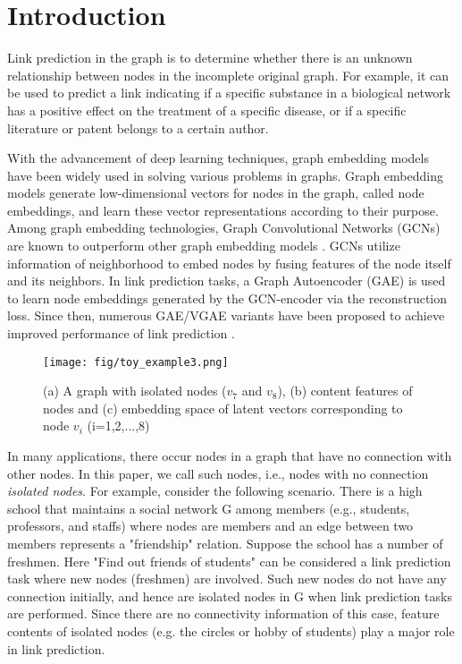 \documentclass[sigconf]{acmart}
\begin{document}


\maketitle

\section{Introduction}
Link prediction in the graph is to determine whether there is an unknown relationship between nodes in the incomplete original graph.
For example, it can be used to predict a link indicating if a specific substance in a biological network has a positive effect on the treatment of a specific disease, or if a specific literature or patent belongs to a certain author.

With the advancement of deep learning techniques, graph embedding models have been widely used in solving various problems in graphs.
Graph embedding models generate low-dimensional vectors for nodes in the graph, called node embeddings, and learn these vector representations according to their purpose. 
Among graph embedding technologies, Graph Convolutional Networks (GCNs) are known to outperform other graph embedding models \cite{kipf2016semi,defferrard2016convolutional,bruna2013spectral}.
GCNs utilize information of neighborhood to embed nodes by fusing features of the node itself and its neighbors. 
In link prediction tasks, a Graph Autoencoder (GAE) \cite{kipf2016variational} is used to learn node embeddings generated by the GCN-encoder via the reconstruction loss.
Since then, numerous GAE/VGAE variants have been proposed to achieve improved performance of link prediction \cite{pan2018adversarially, salha2020simple, mavromatis2020graph, di2020mutual}.

\begin{figure}[h]
    \centering
    \texttt{[image: fig/toy\_example3.png]}
    \caption{(a) A graph with isolated nodes ($v_7$ and $v_8$), (b) content features of nodes and (c) embedding space of latent vectors corresponding to node $v_i$ (i=1,2,...,8)}
    \label{fig:cluster}
\end{figure}

In many applications, there occur nodes in a graph that have no connection with other nodes.
In this paper, we call such nodes, i.e., nodes with no connection \textit{isolated nodes}.
For example, consider the following scenario.
There is a high school that maintains a social network G among members (e.g., students, professors, and staffs) where nodes are members and an edge between two members represents a "friendship" relation.
Suppose the school has a number of freshmen.
Here "Find out friends of students" can be considered a link prediction task where new nodes (freshmen) are involved.
Such new nodes do not have any connection initially, and hence are isolated nodes in G when link prediction tasks are performed.
Since there are no connectivity information of this case, feature contents of isolated nodes (e.g. the circles or hobby of students) play a major role in link prediction.
\end{document}
